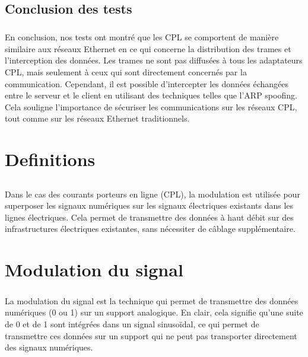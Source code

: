 \documentclass[a4paper,twocolumn]{report}
\begin{document}
\section{Conclusion des tests}
\paragraph{}En conclusion, nos tests ont montré que les CPL se comportent de manière similaire aux réseaux Ethernet en ce qui concerne la distribution des trames et l'interception des données. Les trames ne sont pas diffusées à tous les adaptateurs CPL, mais seulement à ceux qui sont directement concernés par la communication. Cependant, il est possible d'intercepter les données échangées entre le serveur et le client en utilisant des techniques telles que l'ARP spoofing. Cela souligne l'importance de sécuriser les communications sur les réseaux CPL, tout comme sur les réseaux Ethernet traditionnels.


\appendix
\chapter{Definitions}
\section{}




\paragraph{}Dans le cas des courants porteurs en ligne (CPL), la modulation est utilisée pour superposer les signaux numériques sur les signaux électriques existants dans les lignes électriques. Cela permet de transmettre des données à haut débit sur des infrastructures électriques existantes, sans nécessiter de câblage supplémentaire.
\chapter{Modulation du signal}

\paragraph{}La modulation du signal est la technique qui permet de transmettre des données numériques (0 ou 1) sur un support analogique. En clair, cela signifie qu'une suite de 0 et de 1 sont intégrées dans un signal sinusoïdal, ce qui permet de transmettre ces données sur un support qui ne peut pas transporter directement des signaux numériques. 
\end{document}

